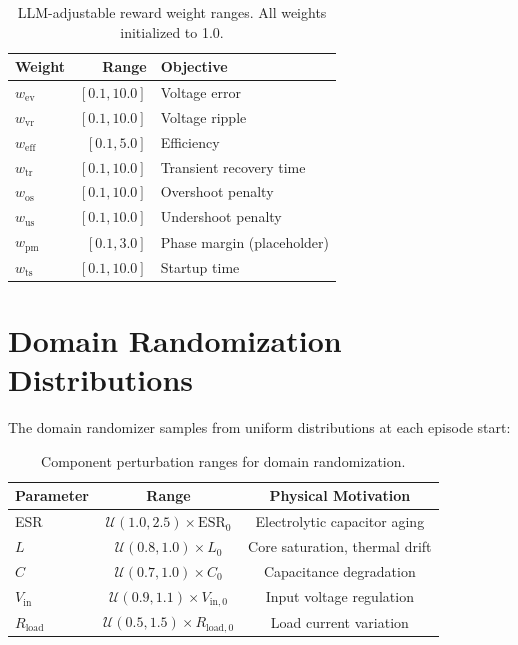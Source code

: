 \documentclass[11pt]{article}
\begin{document}
\begin{table}[h]
\centering
\caption{LLM-adjustable reward weight ranges. All weights initialized to 1.0.}
\begin{tabular}{lrl}
\toprule
\textbf{Weight} & \textbf{Range} & \textbf{Objective} \\
\midrule
$w_{\text{ev}}$ & $[0.1, 10.0]$ & Voltage error \\
$w_{\text{vr}}$ & $[0.1, 10.0]$ & Voltage ripple \\
$w_{\text{eff}}$ & $[0.1, 5.0]$ & Efficiency \\
$w_{\text{tr}}$ & $[0.1, 10.0]$ & Transient recovery time \\
$w_{\text{os}}$ & $[0.1, 10.0]$ & Overshoot penalty \\
$w_{\text{us}}$ & $[0.1, 10.0]$ & Undershoot penalty \\
$w_{\text{pm}}$ & $[0.1, 3.0]$ & Phase margin (placeholder) \\
$w_{\text{ts}}$ & $[0.1, 10.0]$ & Startup time \\
\bottomrule
\end{tabular}
\end{table}

\section{Domain Randomization Distributions}

The domain randomizer samples from uniform distributions at each episode start:

\begin{table}[h]
\centering
\caption{Component perturbation ranges for domain randomization.}
\begin{tabular}{lcc}
\toprule
\textbf{Parameter} & \textbf{Range} & \textbf{Physical Motivation} \\
\midrule
ESR & $\mathcal{U}(1.0, 2.5) \times \text{ESR}_0$ & Electrolytic capacitor aging \\
$L$ & $\mathcal{U}(0.8, 1.0) \times L_0$ & Core saturation, thermal drift \\
$C$ & $\mathcal{U}(0.7, 1.0) \times C_0$ & Capacitance degradation \\
$V_{\text{in}}$ & $\mathcal{U}(0.9, 1.1) \times V_{\text{in},0}$ & Input voltage regulation \\
$R_{\text{load}}$ & $\mathcal{U}(0.5, 1.5) \times R_{\text{load},0}$ & Load current variation \\
\bottomrule
\end{tabular}
\end{table}
\end{document}
